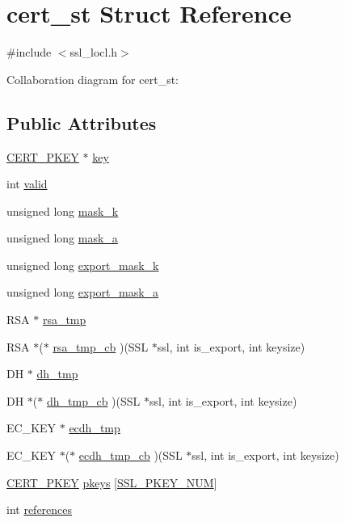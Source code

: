 \hypertarget{structcert__st}{\section{cert\-\_\-st Struct Reference}
\label{structcert__st}
}


{\ttfamily \#include $<$ssl\-\_\-locl.\-h$>$}



Collaboration diagram for cert\-\_\-st\-:
\subsection*{Public Attributes}
\begin{DoxyCompactItemize}
\item 
\hyperlink{ssl__locl_8h_ab376b10820d145fbabe4f4fdf0b3a770}{C\-E\-R\-T\-\_\-\-P\-K\-E\-Y} $\ast$ \hyperlink{structcert__st_aaa35af0490e02946cc5695f9d538d557}{key}
\item 
int \hyperlink{structcert__st_a838ae8304f54182a7fd514e982d22db7}{valid}
\item 
unsigned long \hyperlink{structcert__st_acfbc94f3d12134f3018dc6d29e686521}{mask\-\_\-k}
\item 
unsigned long \hyperlink{structcert__st_a1ab05cae13ea94ef862a45f2ced1e5d5}{mask\-\_\-a}
\item 
unsigned long \hyperlink{structcert__st_a259c7557980181c9e7dc6c19defdd220}{export\-\_\-mask\-\_\-k}
\item 
unsigned long \hyperlink{structcert__st_a75029765406f9a442d9767764a2387fb}{export\-\_\-mask\-\_\-a}
\item 
R\-S\-A $\ast$ \hyperlink{structcert__st_a066253814d4b5677d244f93a83af231e}{rsa\-\_\-tmp}
\item 
R\-S\-A $\ast$($\ast$ \hyperlink{structcert__st_af734d256dd42b25ca0cd753b66d6688a}{rsa\-\_\-tmp\-\_\-cb} )(S\-S\-L $\ast$ssl, int is\-\_\-export, int keysize)
\item 
D\-H $\ast$ \hyperlink{structcert__st_abb30e89df1ada4afc3cf585cee30b3fd}{dh\-\_\-tmp}
\item 
D\-H $\ast$($\ast$ \hyperlink{structcert__st_aec67db7c449f9dbcba4a454ecc45739c}{dh\-\_\-tmp\-\_\-cb} )(S\-S\-L $\ast$ssl, int is\-\_\-export, int keysize)
\item 
E\-C\-\_\-\-K\-E\-Y $\ast$ \hyperlink{structcert__st_a7fb20c811cf6eaa03dce02639d65846b}{ecdh\-\_\-tmp}
\item 
E\-C\-\_\-\-K\-E\-Y $\ast$($\ast$ \hyperlink{structcert__st_a42879a7795442d726faf0237b9d3b5e4}{ecdh\-\_\-tmp\-\_\-cb} )(S\-S\-L $\ast$ssl, int is\-\_\-export, int keysize)
\item 
\hyperlink{ssl__locl_8h_ab376b10820d145fbabe4f4fdf0b3a770}{C\-E\-R\-T\-\_\-\-P\-K\-E\-Y} \hyperlink{structcert__st_a9455badb9626d3b50d67ddae1156ea44}{pkeys} \mbox{[}\hyperlink{ssl__locl_8h_ae56b6c56e5819da2bf95a533238f69f8}{S\-S\-L\-\_\-\-P\-K\-E\-Y\-\_\-\-N\-U\-M}\mbox{]}
\item 
int \hyperlink{structcert__st_a35da30deb4ca647a4b9e010be514621f}{references}
\end{DoxyCompactItemize}


